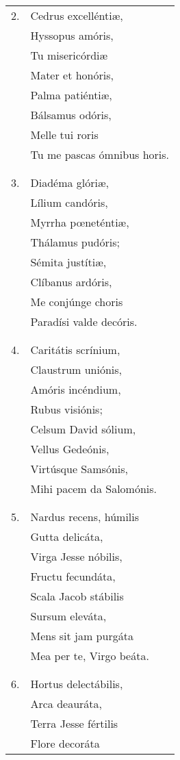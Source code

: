 \begin{longtable}{ll}
2. &Cedrus excelléntiæ,\\
&Hyssopus amóris,\\
&Tu misericórdiæ\\
&Mater et honóris,\\
&Palma patiéntiæ,\\
&Bálsamus odóris,\\
&Melle tui roris\\
&Tu me pascas ómnibus horis.\\
\\\\
3. &Diadéma glóriæ,\\
&Lílium candóris,\\
&Myrrha pœneténtiæ,\\
&Thálamus pudóris;\\
&Sémita justítiæ,\\
&Clíbanus ardóris,\\
&Me conjúnge choris\\
&Paradísi valde decóris.\\
\\\\
4. &Caritátis scrínium,\\
&Claustrum uniónis,\\
&Amóris incéndium,\\
&Rubus visiónis;\\
&Celsum David sólium,\\
&Vellus Gedeónis,\\
&Virtúsque Samsónis,\\
&Mihi pacem da Salomónis.\\
\\\\
5. &Nardus recens, húmilis\\
&Gutta delicáta,\\
&Virga Jesse nóbilis,\\
&Fructu fecundáta,\\
&Scala Jacob stábilis\\
&Sursum eleváta,\\
&Mens sit jam purgáta\\
&Mea per te, Virgo beáta.\\
\\\\
6. &Hortus delectábilis,\\
&Arca deauráta,\\
&Terra Jesse fértilis\\
&Flore decoráta\\

\end{longtable}
